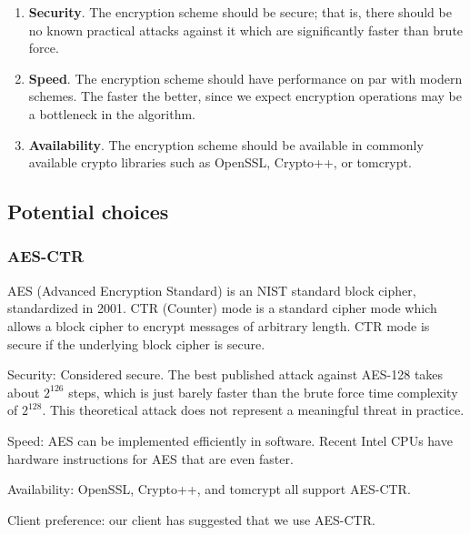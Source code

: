 \documentclass[onecolumn, draftclsnofoot,10pt, compsoc]{IEEEtran}
\begin{document}
\begin{enumerate}
  \item \textbf{Security}.
  The encryption scheme should be secure; that is, there should be no known practical attacks against it which are significantly faster than brute force.

  \item \textbf{Speed}.
  The encryption scheme should have performance on par with modern schemes. The faster the better, since we expect encryption operations may be a bottleneck in the algorithm.

  \item \textbf{Availability}.
  The encryption scheme should be available in commonly available crypto libraries such as OpenSSL, Crypto++, or tomcrypt.

\end{enumerate}

\subsection{ Potential choices }
\subsubsection{ AES-CTR }

AES (Advanced Encryption Standard) is an NIST standard block cipher, standardized in 2001. CTR (Counter) mode is a standard cipher mode which allows a block cipher to encrypt messages of arbitrary length. CTR mode is secure if the underlying block cipher is secure.


Security: Considered secure. The best published attack against AES-128 takes about $2^{126}$ steps, which is just barely faster than the brute force time complexity of $2^{128}$. %
This theoretical attack does not represent a meaningful threat in practice.

Speed: AES can be implemented efficiently in software. %
Recent Intel CPUs have hardware instructions for AES that are even faster.

Availability: OpenSSL, Crypto++, and tomcrypt all support AES-CTR.

Client preference: our client has suggested that we use AES-CTR.
\end{document}
